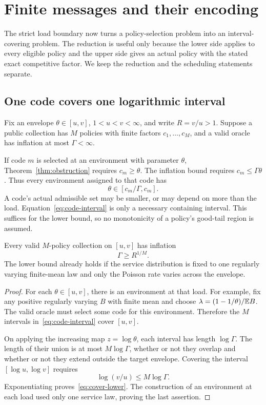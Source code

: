 \section{Finite messages and their encoding}\label{sec:advice}
The strict load boundary now turns a policy-selection problem into an interval-covering problem. The reduction is useful only because the lower side applies to every eligible policy and the upper side gives an actual policy with the stated exact competitive factor. We keep the reduction and the scheduling statements separate.

\subsection{One code covers one logarithmic interval}
Fix an envelope $\theta\in[u,v]$, $1<u<v<\infty$, and write $R=v/u>1$. Suppose a public collection has $M$ policies with finite factors $c_1,\ldots,c_M$, and a valid oracle has inflation at most $\Gamma<\infty$.

If code $m$ is selected at an environment with parameter $\theta$, Theorem~\ref{thm:obstruction} requires $c_m\geq\theta$. The inflation bound requires $c_m\leq\Gamma\theta$. Thus every environment assigned to that code has
\begin{equation}\label{eq:code-interval}
 \theta\in[c_m/\Gamma,c_m].
\end{equation}
A code's actual admissible set may be smaller, or may depend on more than the load. Equation~\eqref{eq:code-interval} is only a necessary containing interval. This suffices for the lower bound, so no monotonicity of a policy's good-tail region is assumed.

\begin{proposition}\label{prop:covering}
Every valid $M$-policy collection on $[u,v]$ has inflation
\begin{equation}\label{eq:cover-lower}
 \Gamma\geq R^{1/M}.
\end{equation}
The lower bound already holds if the service distribution is fixed to one regularly varying finite-mean law and only the Poisson rate varies across the envelope.
\end{proposition}
\begin{proof}
For each $\theta\in[u,v]$, there is an environment at that load. For example, fix any positive regularly varying $B$ with finite mean and choose $\lambda=(1-1/\theta)/\mathbb E B$. The valid oracle must select some code for this environment. Therefore the $M$ intervals in~\eqref{eq:code-interval} cover $[u,v]$.

On applying the increasing map $z=\log\theta$, each interval has length $\log\Gamma$. The length of their union is at most $M\log\Gamma$, whether or not they overlap and whether or not they extend outside the target envelope. Covering the interval $[\log u,\log v]$ requires
\[
 \log(v/u)\leq M\log\Gamma.
\]
Exponentiating proves~\eqref{eq:cover-lower}. The construction of an environment at each load used only one service law, proving the last assertion.
\end{proof}

